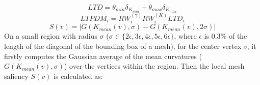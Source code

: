 \begin{equation}
LTD =\theta_{min} \delta_{K_{min}} +\theta_{max} \delta_{K_{max}}
\end{equation}
\begin{equation}
LTPDM_i =RW^{(\gamma)}_iRW^{(K)}_iLTD_i
\end{equation}
\begin{equation}
S(v)= |G(K_{mean}(v), \sigma) - G(K_{mean}(v), 2\sigma)|
\end{equation}
On a small region with radius $\sigma$ ($\sigma \in \{ 2\epsilon, 3\epsilon, 4\epsilon, 5\epsilon, 6\epsilon \}$, where $\epsilon$ is 0.3\% of the length of the diagonal of the bounding box of a mesh), for the center vertex $v$, it firstly computes the Gaussian average of the mean curvatures ($G(K_{mean}(v), \sigma)$) over the vertices within the region. Then the local mesh saliency $S(v)$ is calculated as: